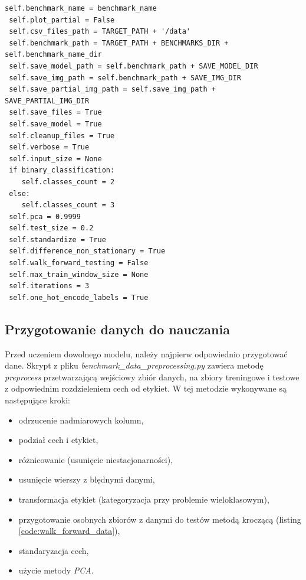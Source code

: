\documentclass[a4paper, twoside, 11pt, openright]{article}
\begin{document}
\begin{lstlisting}[caption={Parametry z klasy \textit{BenchmarkParams} (plik \textit{benchmark\_params.py})}, label={code:params},frame=single, captionpos=b, mathescape=true]
 self.benchmark_name = benchmark_name
 self.plot_partial = False
 self.csv_files_path = TARGET_PATH + '/data'
 self.benchmark_path = TARGET_PATH + BENCHMARKS_DIR + self.benchmark_name_dir
 self.save_model_path = self.benchmark_path + SAVE_MODEL_DIR
 self.save_img_path = self.benchmark_path + SAVE_IMG_DIR
 self.save_partial_img_path = self.save_img_path + SAVE_PARTIAL_IMG_DIR
 self.save_files = True
 self.save_model = True
 self.cleanup_files = True
 self.verbose = True
 self.input_size = None
 if binary_classification:
    self.classes_count = 2
 else:
    self.classes_count = 3
 self.pca = 0.9999
 self.test_size = 0.2
 self.standardize = True
 self.difference_non_stationary = True
 self.walk_forward_testing = False
 self.max_train_window_size = None
 self.iterations = 3
 self.one_hot_encode_labels = True
\end{lstlisting}

\subsection*{Przygotowanie danych do nauczania}

Przed uczeniem dowolnego modelu, należy najpierw odpowiednio przygotować dane. Skrypt z pliku \textit{benchmark\_data\_preprocessing.py} zawiera metodę \textit{preprocess} przetwarzającą wejściowy zbiór danych, na zbiory treningowe i testowe z odpowiednim rozdzieleniem cech od etykiet. W tej metodzie wykonywane są następujące kroki:
\begin{itemize}
\item odrzucenie nadmiarowych kolumn,
\item podział cech i etykiet,
\item różnicowanie (usunięcie niestacjonarności),
\item usunięcie wierszy z błędnymi danymi,
\item transformacja etykiet (kategoryzacja przy problemie wieloklasowym),
\item przygotowanie osobnych zbiorów z danymi do testów metodą kroczącą (listing \ref{code:walk_forward_data}),
\item standaryzacja cech,
\item użycie metody \textit{PCA}.
\end{itemize}
\end{document}
